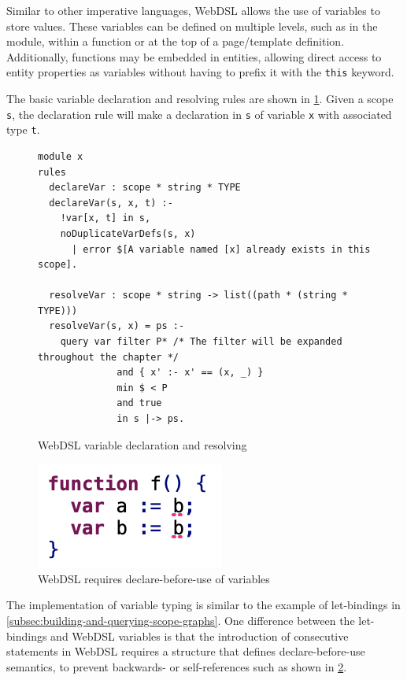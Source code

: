       Similar to other imperative languages, WebDSL allows the use of variables to store values. These variables can be defined on multiple levels, such as in the module, within a function or at the top of a page/template definition. Additionally, functions may be embedded in entities, allowing direct access to entity properties as variables without having to prefix it with the \texttt{this} keyword.

      The basic variable declaration and resolving rules are shown in \cref{fig:webdsl-simple-variable-declaration-and-resolving}. Given a scope \texttt{s}, the declaration rule will make a declaration in \texttt{s} of variable \texttt{x} with associated type \texttt{t}.

      \begin{figure}[H]
        \begin{verbatim}
module x
rules
  declareVar : scope * string * TYPE
  declareVar(s, x, t) :-
    !var[x, t] in s,
    noDuplicateVarDefs(s, x)
      | error $[A variable named [x] already exists in this scope].

  resolveVar : scope * string -> list((path * (string * TYPE)))
  resolveVar(s, x) = ps :-
    query var filter P* /* The filter will be expanded throughout the chapter */
              and { x' :- x' == (x, _) }
              min $ < P
              and true
              in s |-> ps.
        \end{verbatim}
        \caption{\label{fig:webdsl-simple-variable-declaration-and-resolving}WebDSL variable declaration and resolving}
      \end{figure}

      \begin{figure}
        \capstart
        \includegraphics{../img/webdsl-simple-variable-declare-before-use}
        \caption{\label{fig:webdsl-simple-variable-declare-before-use}WebDSL requires declare-before-use of variables}
      \end{figure}

      The implementation of variable typing is similar to the example of let-bindings in \cref{subsec:building-and-querying-scope-graphs}. One difference between the let-bindings and WebDSL variables is that the introduction of consecutive statements in WebDSL requires a structure that defines declare-before-use semantics, to prevent backwards- or self-references such as shown in \cref{fig:webdsl-simple-variable-declare-before-use}.

